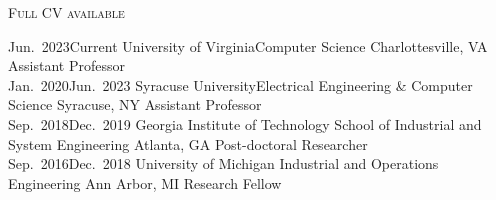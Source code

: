 \documentclass[localFont,alternative]{metadataShortBio}
\begin{document}
\makecvheader\sloppy\allowdisplaybreaks


	\makecvfooter
		{\textsc{}} %
		{\textsc{Full CV available  }}
		{\thepage}



\vspace{-6pt}
\begin{experiences}
  \job
    {Jun.~2023}{Current}
    {University of Virginia}{Computer Science}
    {Charlottesville, VA}
    {Assistant Professor}\\[-10pt]

  \job
    {Jan.~2020}{Jun.~2023}
    {Syracuse University}{Electrical Engineering \& Computer Science}
    {Syracuse, NY}
    {Assistant Professor}\\[-10pt]

  \job
    {Sep.~2018}{Dec.~2019}
    {Georgia Institute of Technology}
    {School of Industrial and System Engineering}
    {Atlanta, GA}
    {Post-doctoral Researcher}\\[-10pt]
  \job
    {Sep.~2016}{Dec.~2018}
    {University of Michigan}
    {Industrial and Operations Engineering}
    {Ann Arbor, MI}
    {Research Fellow}
    
\end{experiences}

\vspace{-2pt}
\vspace{-6pt}
\end{document}
